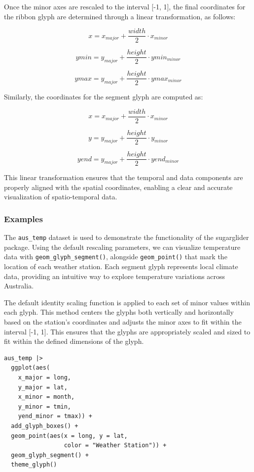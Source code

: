 Once the minor axes are rescaled to the interval {[}-1, 1{]}, the final coordinates for the ribbon glyph are determined through a linear transformation, as follows:

\[
x = x_{major} + \frac{width}{2} \cdot x_{minor}
\]

\[
ymin = y_{major} + \frac{height}{2} \cdot ymin_{minor}
\]

\[
ymax = y_{major} + \frac{height}{2} \cdot ymax_{minor}
\]

Similarly, the coordinates for the segment glyph are computed as:

\[
x = x_{major} + \frac{width}{2} \cdot x_{minor}
\]

\[
y = y_{major} + \frac{height}{2} \cdot y_{minor}
\]

\[
yend = y_{major} + \frac{height}{2} \cdot yend_{minor}
\]

This linear transformation ensures that the temporal and data components are properly aligned with the spatial coordinates, enabling a clear and accurate visualization of spatio-temporal data.

\hypertarget{examples}{%
\subsubsection{Examples}\label{examples}}

The \texttt{aus\_temp} dataset is used to demonstrate the functionality of the sugarglider package. Using the default rescaling parameters, we can visualize temperature data with \texttt{geom\_glyph\_segment()}, alongside \texttt{geom\_point()} that mark the location of each weather station. Each segment glyph represents local climate data, providing an intuitive way to explore temperature variations across Australia.

The default identity scaling function is applied to each set of minor values within each glyph. This method centers the glyphs both vertically and horizontally based on the station's coordinates and adjusts the minor axes to fit within the interval {[}-1, 1{]}. This ensures that the glyphs are appropriately scaled and sized to fit within the defined dimensions of the glyph.

\begin{verbatim}
aus_temp |>
  ggplot(aes(
    x_major = long, 
    y_major = lat, 
    x_minor = month, 
    y_minor = tmin, 
    yend_minor = tmax)) +
  add_glyph_boxes() +
  geom_point(aes(x = long, y = lat,
                 color = "Weather Station")) +
  geom_glyph_segment() +
  theme_glyph()
\end{verbatim}

